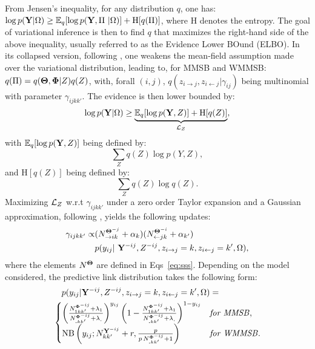 From Jensen's inequality, for any distribution $q$, one has: $\log p({\mathbf{Y}} | \Omega) \ge \mathbb{E}_{q}[\log p({\mathbf{Y}}, \Pi\ | \Omega)] + \textrm{H}[q(\Pi)]$,
where $\textrm{H}$ denotes the entropy. The goal of variational inference is then to find $q$ that maximizes the right-hand side of the above inequality, usually referred to as the Evidence Lower BOund (ELBO). In its collapsed version, following \cite{teh2007collapsed}, one weakens the mean-field assumption made over the variational distribution, leading to, for MMSB and WMMSB: $q(\Pi) = q({\boldsymbol{\Theta}}, {\boldsymbol{\Phi}} | Z) q(Z)$,
with, forall $(i,j)$, $q(z_{i \rightarrow j}, z_{i \leftarrow j}|\gamma_{ij})$ being multinomial with parameter $\gamma_{ijkk'}$. The evidence is then lower bounded by:
%
\begin{equation*}
\log p({\mathbf{Y}}|\Omega) \geq \underbrace{\mathbb{E}_{q}[\log p({\mathbf{Y}}, Z)] + \textrm{H}[q(Z)]}_{\mathcal{L}_Z},
\end{equation*}
%
with $\mathbb{E}_{q}[\log p({\mathbf{Y}}, Z)]$ being defined by:
\[
\sum_Z q(Z) \log p(Y, Z),
\]
%
and $\textrm{H}[q(Z)]$ being defined by:
%
\[
\sum_Z q(Z) \log q(Z).
\]
%
Maximizing $\mathcal{L}_Z$ w.r.t $\gamma_{ijkk'}$ under a zero order Taylor expansion and a Gaussian approximation, following \cite{teh2007collapsed,asuncion2009smoothing}, yields the following updates:
%
\begin{align} \label{eq:maximization}
\gamma_{ijkk'} \propto &(N_{\rightarrow ik}^{{\Bs{\Theta}}^{-j}} + \alpha_k) (N_{\leftarrow jk}^{{\Bs{\Theta}}^{-i}} + \alpha_{k'}) \nonumber\\
  &p(y_{ij} | {\B{Y}}^{-ij}, Z^{- ij}, \zij=k, \zji=k',\Omega),
\end{align}
%
where the elements $N^{{\boldsymbol{\Theta}}}$ are defined in Eqs~\eqref{eq:sss}. Depending on the model considered, the predictive link distribution
takes the following form:
%
\begin{align*}
&\quad p(y_{ij} | {\B{Y}}^{-ij}, Z^{- ij}, \zij=k, \zji=k',\Omega) = \\
&\begin{cases}
    \left( \frac{ N^{{\Bs{\Phi}}^{-ij}}_{1 kk'} + \lambda_1}{N^{{\Bs{\Phi}}^{-ij}}_{\bm{.}kk'} + \lambda_{\bm{.}}}\right)^{y_{ij}} \left( 1- \frac{ N^{{\Bs{\Phi}}^{-ij}}_{1 kk'} + \lambda_1}{N^{{\Bs{\Phi}}^{-ij}}_{\bm{.}kk'} + \lambda_{\bm{.}}}\right)^{1-y_{ij}}  & \textrm{\textit{for MMSB}}, \\
    \mathrm{NB}\left(y_{ij}; N^{{\B{Y}}^{-ij}}_{kk'} + r, \frac{p}{p\,N^{{\Bs{\Phi}}^{-ij}}_{\bm{.}kk'} + 1} \right) & \textrm{\textit{for WMMSB}}. %
\end{cases}
\end{align*}

